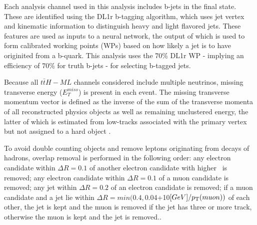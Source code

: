 Each analysis channel used in this analysis includes b-jets in the final state. These are identified using the DL1r b-tagging algorithm, which uses jet vertex and kinematic information to distinguish heavy and light flavored jets. These features are used as inputs to a neural network, the output of which is used to form calibrated working points (WPs) based on how likely a jet is to have originited from a b-quark. This analysis uses the 70\% DL1r WP - implying an efficiency of 70\% for truth b-jets - for selecting b-tagged jets. 

Because all $t\bar{t}H-ML$ channels considered include multiple neutrinos, missing transverse energy ($E_T^{miss}$) is present in each event. The missing transverse momentum vector is defined as the inverse of the sum of the transverse momenta of all reconstructed physics objects as well as remaining unclustered energy, the latter of which is estimated from low-\pt tracks associated with the primary vertex but not assigned to a hard object \cite{ATL-PHYS-PUB-2015-027}.

To avoid double counting objects and remove leptons originating from decays of hadrons, overlap removal is performed in the following order: any electron candidate within $\Delta R = 0.1$ of another electron candidate with higher \pt\ is removed; any electron candidate within $\Delta R = 0.1$ of a muon candidate is removed; any jet within $\Delta R = 0.2$ of an electron candidate is removed; if a muon candidate and a jet lie within $\Delta R = min(0.4, $0.04+10$[GeV]/p_{\text{T}}(muon))$ of each other, the jet is kept and the muon is removed if the jet has three or more track, otherwise the muon is kept and the jet is removed..
